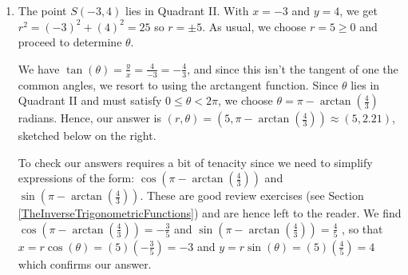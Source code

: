 \documentclass{ximera}
\begin{document}
\begin{example}
\begin{explanation}
\begin{enumerate}
 Concerning $\theta$, we once again find more or less `by inspection' that $\theta = \frac{3\pi}{2}$ satisfies $0 \leq \theta < 2\pi$ with its terminal side along the negative $y$-axis.  Hence, our answer is $\left(3, \frac{3\pi}{2}\right)$, as seen below on the left.  
 
  
 
 To check, we note $x = r \cos(\theta) = 3 \cos\left( \frac{3\pi}{2}\right) = (3)(0) = 0$ and $y = r \sin(\theta) = 3 \sin\left( \frac{3\pi}{2}\right) = 3(-1) = -3$.

\item  The point $S(-3,4)$ lies in Quadrant II.  With $x = -3$ and $y = 4$, we get $r^2 = (-3)^2 + (4)^2 = 25$ so $r = \pm 5$.  As usual, we choose $r = 5 \geq 0$ and proceed to determine $\theta$.  

 

We have $\tan(\theta) = \frac{y}{x} = \frac{4}{-3} = -\frac{4}{3}$, and since this isn't the tangent of one the common angles, we resort to using the arctangent function. Since $\theta$ lies in Quadrant II and must satisfy $0 \leq \theta < 2\pi$, we choose $\theta = \pi - \arctan\left(\frac{4}{3}\right)$ radians.  Hence, our answer is $(r,\theta) = \left(5, \pi - \arctan\left(\frac{4}{3}\right)\right) \approx (5,2.21)$, sketched below on the right.  

 

To check our answers requires a bit of tenacity since we need to simplify expressions of the form:  $\cos\left(\pi - \arctan\left(\frac{4}{3}\right)\right)$ and $\sin\left(\pi - \arctan\left(\frac{4}{3}\right)\right)$.  These are good review exercises (see Section \ref{TheInverseTrigonometricFunctions}) and are hence left to the reader.  We find  $\cos\left(\pi - \arctan\left(\frac{4}{3}\right)\right) = -\frac{3}{5}$ and $\sin\left(\pi - \arctan\left(\frac{4}{3}\right)\right) = \frac{4}{5}$ , so that $x = r \cos(\theta) = (5)\left(-\frac{3}{5}\right) = -3$ and $y = r \sin(\theta) = (5) \left(\frac{4}{5}\right) = 4$ which confirms our answer.

\end{enumerate}

\begin{image}
\end{image}
\end{explanation}
\end{example}
\end{document}
